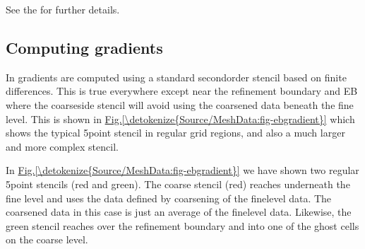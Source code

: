 \documentclass[letterpaper,10pt,english]{sphinxmanual}
\begin{document}
\begin{sphinxVerbatim}[commandchars=\\\{\},formatcom=\scriptsize]
      

         
\end{sphinxVerbatim}

See the  for further details.


\subsection{Computing gradients}
\label{\detokenize{Source/MeshData:computing-gradients}}\label{\detokenize{Source/MeshData:chap-gradients}}
In  gradients are computed using a standard second\sphinxhyphen{}order stencil based on finite differences.
This is true everywhere except near the refinement boundary and EB where the coarse\sphinxhyphen{}side stencil will avoid using the coarsened data beneath the fine level.
This is shown in \hyperref[\detokenize{Source/MeshData:fig-ebgradient}]{Fig.\@ \ref{\detokenize{Source/MeshData:fig-ebgradient}}} which shows the typical 5\sphinxhyphen{}point stencil in regular grid regions, and also a much larger and more complex stencil.

In \hyperref[\detokenize{Source/MeshData:fig-ebgradient}]{Fig.\@ \ref{\detokenize{Source/MeshData:fig-ebgradient}}} we have shown two regular 5\sphinxhyphen{}point stencils (red and green).
The coarse stencil (red) reaches underneath the fine level and uses the data defined by coarsening of the fine\sphinxhyphen{}level data.
The coarsened data in this case is just an average of the fine\sphinxhyphen{}level data.
Likewise, the green stencil reaches over the refinement boundary and into one of the ghost cells on the coarse level.
\end{document}
